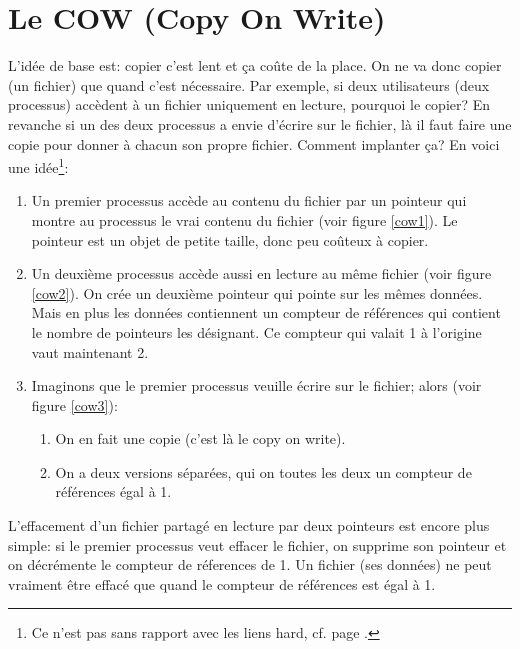 \section{Le COW (Copy On Write)}
L'idée de base est:  copier c'est
lent et ça coûte de la place. On
ne va donc copier (un fichier) que 
quand c'est nécessaire. Par exemple, si deux utilisateurs (deux
processus) accèdent à un fichier uniquement en lecture, pourquoi le
copier?
En revanche si un des deux processus a envie d'écrire sur le fichier,
là il faut faire une copie pour donner à chacun son propre
fichier. Comment implanter ça? En voici une idée\footnote{Ce n'est pas sans
rapport avec les \og liens hard\fg{}, cf. page \pageref{hardlink}.}:
\begin{enumerate}
  \item Un premier processus accède au contenu du fichier par un
    pointeur qui montre au 
    processus le \og vrai\fg{} contenu du fichier (voir figure \ref{cow1}).
    Le pointeur est un objet de petite taille, donc peu coûteux à copier.
  \item Un deuxième processus accède aussi en lecture au même fichier
    (voir figure \ref{cow2}). On crée un deuxième pointeur qui pointe
    sur les mêmes 
    données. Mais en plus les données contiennent un compteur de
    références qui contient le nombre de pointeurs les désignant. Ce
    compteur qui valait 1 à l'origine vaut maintenant 2.
  \item Imaginons que le premier processus veuille écrire sur le
    fichier; alors (voir figure \ref{cow3}):
    \begin{enumerate}
    \item On en fait une copie (c'est là le \og copy on write\fg).
    \item On a deux versions séparées, qui on toutes les deux un
      compteur de références égal à 1.
    \end{enumerate}
\end{enumerate}
 L'effacement d'un fichier partagé en lecture par deux pointeurs est
 encore plus simple: si le premier processus veut effacer le fichier,
 on supprime son  pointeur et on décrémente le compteur de réferences
 de 1. Un fichier (ses données) ne peut vraiment être effacé que quand
 le compteur de  références est égal à 1.


